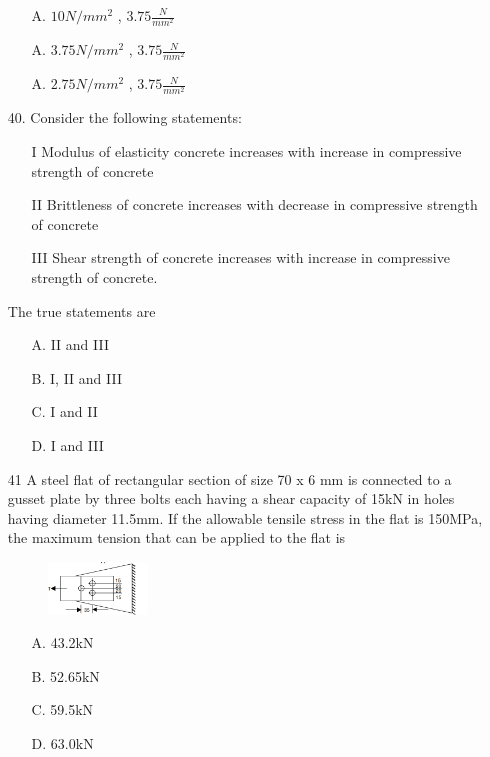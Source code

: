 \documentclass[journal]{IEEEtran}
\begin{document}
\begin{enumerate}
\begin{enumerate}
    \item [A.] $10N/mm^2$ , $3.75\frac{N}{mm^2}$
    \item [A.] $3.75N/mm^2$ , $3.75\frac{N}{mm^2}$ 
    \item [A.] $2.75N/mm^2$ , $3.75\frac{N}{mm^2}$ 
  \end{enumerate}
  \item[40.] Consider the following statements: 
  \begin{enumerate}
    \item [I] Modulus of elasticity concrete increases with increase in compressive
    strength of concrete
    \item [II] Brittleness of concrete increases with decrease in compressive strength of
    concrete
    \item [III] Shear strength of concrete increases with increase in compressive strength
    of concrete. 
  \end{enumerate}
  The true statements are 
  \begin{enumerate}
    \item [A.] II and III
    \item [B.] I, II and III
    \item [C.] I and II
    \item [D.] I and III
  \end{enumerate}
  \item[41]  A steel flat of rectangular section of size 70 x 6 mm is connected to a gusset plate
  by three bolts each having a shear capacity of 15kN in holes having diameter
  11.5mm. If the allowable tensile stress in the flat is 150MPa, the maximum
  tension that can be applied to the flat is
  \begin{figure}[h!]
    \centering
    \includegraphics[width=0.25\textwidth]{figs/Fig_3.png}  %
    \label{fig:sample3}
\end{figure}
  \begin{enumerate}
    \item [A.] 43.2kN
    \item [B.] 52.65kN
    \item [C.] 59.5kN
    \item [D.] 63.0kN
  \end{enumerate}

\end{enumerate}
\end{document}

